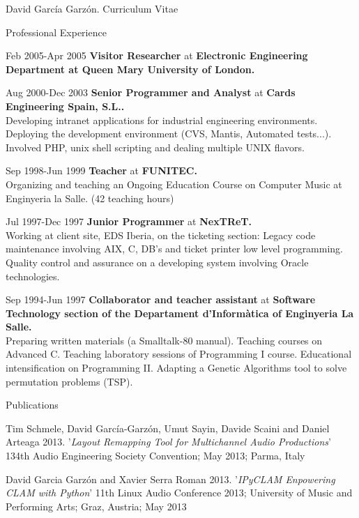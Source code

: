\documentclass{article}
\begin{document}
\begin{cv}{David García Garzón. Curriculum Vitae}
\begin{cvlist}{Professional Experience}
\item[Feb 2005-Apr 2005]
{\bf Visitor Researcher} at
{\bf Electronic Engineering Department at Queen Mary University of London.}\\


\item[Aug 2000-Dec 2003]
{\bf Senior Programmer and Analyst} at
{\bf Cards Engineering Spain, S.L..}\\
Developing intranet applications for industrial engineering environments. Deploying the development environment (CVS, Mantis, Automated tests...). Involved PHP, unix shell scripting and dealing multiple UNIX flavors. 

\item[Sep 1998-Jun 1999]
{\bf Teacher} at
{\bf FUNITEC.}\\
Organizing and teaching an Ongoing Education Course on Computer Music at Enginyeria la Salle. (42 teaching hours)

\item[Jul 1997-Dec 1997]
{\bf Junior Programmer} at
{\bf NexTReT.}\\
Working at client site, EDS Iberia, on the ticketing section: Legacy code maintenance involving AIX, C, DB’s and ticket printer low level programming. Quality control and assurance on a developing system involving Oracle technologies.

\item[Sep 1994-Jun 1997]
{\bf Collaborator and teacher assistant} at
{\bf Software Technology section of the Departament d'Informàtica of Enginyeria La Salle.}\\
Preparing written materials (a Smalltalk-80 manual). Teaching courses on Advanced C. Teaching laboratory sessions of Programming I course. Educational intensification on Programming II. Adapting a Genetic Algorithms tool to solve permutation problems (TSP). 
	
\end{cvlist}

\begin{cvlist}{Publications}

\item[] {\sc Tim Schmele, David García-Garzón, Umut Sayin, Davide Scaini and Daniel Arteaga} 2013.
'{\em Layout Remapping Tool for Multichannel Audio Productions}'
134th Audio Engineering Society Convention; May 2013; Parma, Italy

\item[] {\sc David Garcia Garzón and Xavier Serra Roman} 2013.
'{\em IPyCLAM Enpowering CLAM with Python}'
11th Linux Audio Conference 2013; University of Music and Performing Arts; Graz, Austria; May 2013


\end{cvlist}
\end{cv}
\end{document}
